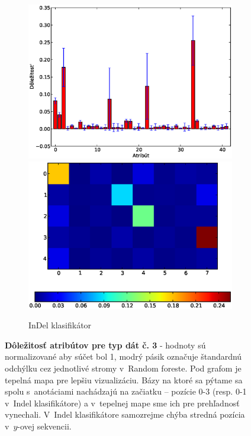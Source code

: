 \begin{figure}[htp]
\begin{subfigure}[t]{0.4\textwidth}
                \includegraphics[width=\textwidth]{images/clf_fi/randomforest_fullcmp_5_indel_bars}
                \includegraphics[width=\textwidth]{images/clf_fi/randomforest_fullcmp_5_indel_heatmap}
                \caption{InDel klasifikátor}
                \label{fig:datatype3-i}
        \end{subfigure}
        \caption[Dôležitosť atribútov pre typ dát č. 3]{
        \textbf{Dôležitosť atribútov pre typ dát č. 3} - hodnoty sú normalizované aby súčet bol 1, modrý pásik označuje štandardnú odchýlku cez jednotlivé stromy v~Random foreste.
        Pod grafom je tepelná mapa pre lepšiu vizualizáciu. Bázy na ktoré sa pýtame sa spolu s~anotáciami nachádzajú na začiatku -- pozície 0-3 (resp. 0-1 v~Indel klasifikátore) a v~tepelnej mape sme ich pre prehľadnosť vynechali.
        V~Indel klasifikátore samozrejme chýba stredná pozícia v~$y$-ovej sekvencii.
        }
        \label{fig:datatype3}
\end{figure}

